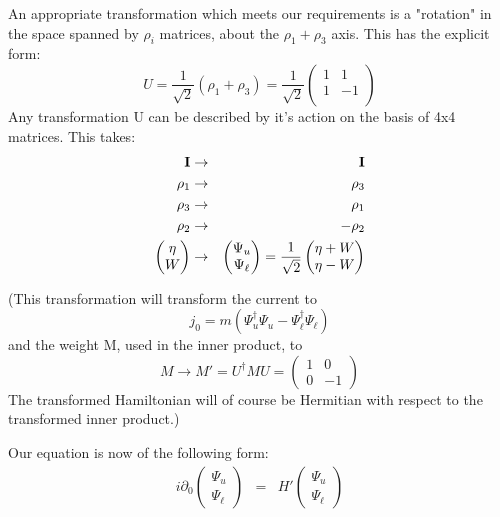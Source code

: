 An appropriate transformation which meets our requirements is a "rotation" in the space spanned by $\rho_i$ matrices, about the $\rho_1 + \rho_3$ axis.  This has the explicit form:
\begin{equation}
U =\frac{1}{\sqrt {2}}  (\rho_1 + \rho_3)	
	= \frac{1}{\sqrt {2}}
\begin{pmatrix}
1	&	1	\\
1	&	-1	\\
\end{pmatrix}
\end{equation}
Any transformation U can be described by it's action on the basis of 4x4 matrices.   This takes:
\begin{eqnarray*}
{\bf I} & \to &	{\bf I}	\\
\rho_1	& \to &	\rho_3	\\
\rho_3	& \to &	\rho_1	\\
\rho_2	& \to &	-\rho_2	\\
\begin{pmatrix}
	\eta	\\	W
\end{pmatrix}
&	\to	&
\begin{pmatrix}
\Psi_u \\	\Psi_\ell
\end{pmatrix}
=	\frac{1}{\sqrt{2}}
\begin{pmatrix}
\eta	+ W \\	\eta - W
\end{pmatrix}
\end{eqnarray*}

(This transformation will transform the current to
\[	j_0 =  m (\Psi_u^\dagger \Psi_u  - \Psi_\ell^\dagger \Psi_\ell)		\]
and the weight M, used in the inner product, to
\[	M \to M' = U^\dagger M U = \begin{pmatrix} 1 & 0 \\ 0 & -1 \end{pmatrix}	\]
The transformed Hamiltonian will of course be Hermitian with respect to the transformed inner product.)

Our equation is now of the following form:
\begin{eqnarray*}
i\partial_0 \begin{pmatrix} \Psi_u \\	\Psi_\ell \end{pmatrix}  
	& =&
	H' \begin{pmatrix} \Psi_u \\	\Psi_\ell  \end{pmatrix}
\end{eqnarray*}

